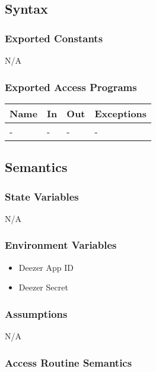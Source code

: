 \documentclass[12pt, titlepage]{article}
\begin{document}
\subsection{Syntax}

\subsubsection{Exported Constants}
N/A

\subsubsection{Exported Access Programs}

\begin{center}
\begin{tabular}{p{2cm} p{4cm} p{4cm} p{2cm}}
\hline
\textbf{Name} & \textbf{In} & \textbf{Out} & \textbf{Exceptions}\\
\hline%
- &- &- &-\\ 
\hline
\end{tabular}
\end{center}

\subsection{Semantics}

\subsubsection{State Variables}
N/A

\subsubsection{Environment Variables}
\begin{itemize}
  \item Deezer App ID
  \item Deezer Secret
\end{itemize}

\subsubsection{Assumptions}
N/A

\subsubsection{Access Routine Semantics}
\end{document}
